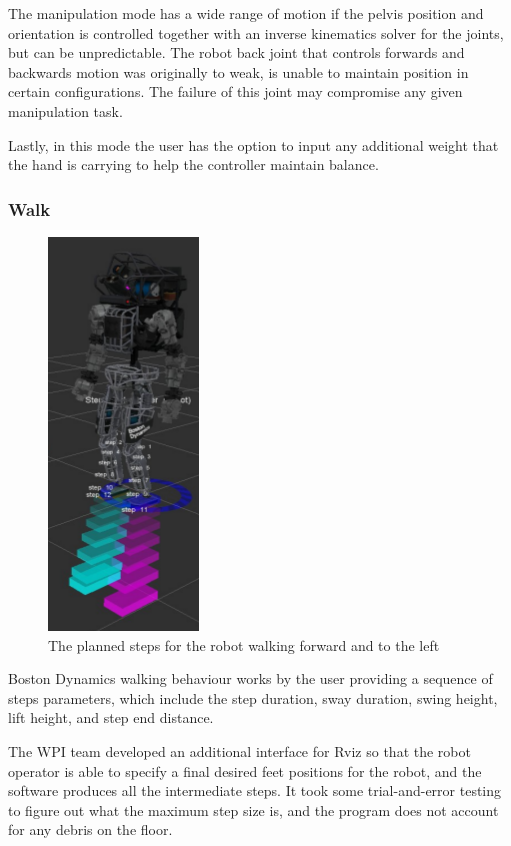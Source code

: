 \documentclass{article}
\begin{document}
The manipulation mode has a wide range of motion if the pelvis position and orientation is controlled together with an inverse kinematics solver for the joints, but can be unpredictable. The robot back joint that controls forwards and backwards motion was originally to weak, is unable to maintain position in certain configurations. The failure of this joint may compromise any given manipulation task.

Lastly, in this mode the user has the option to input any additional weight that the hand is carrying to help the controller maintain balance.
 
\subsubsection{Walk}

\begin{figure}
  \begin{center}
    \includegraphics[scale=0.5]{images/step_gui.png}
  \end{center}
  \caption{The planned steps for the robot walking forward and to the left}
\end{figure}


Boston Dynamics walking behaviour works by the user providing a sequence of steps parameters, which include the step duration, sway duration, swing height, lift height, and step end distance.  

The WPI team developed an additional interface for Rviz so that the robot operator is able to specify a final desired feet positions for the robot, and the software produces all the intermediate steps. It took some trial-and-error testing to figure out what the maximum step size is, and the program does not account for any debris on the floor. 
\end{document}
